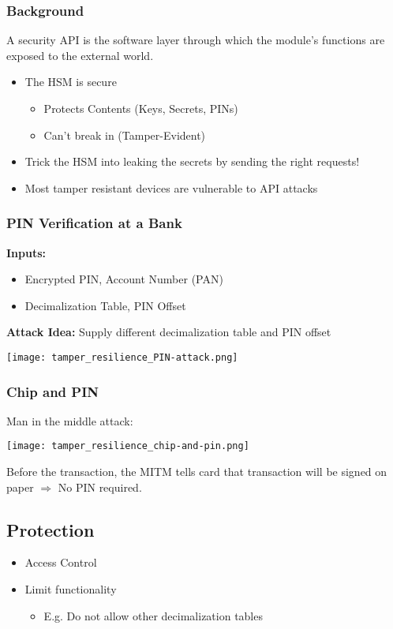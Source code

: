 \subsubsection{Background}
A security API is the software layer through which the module's functions are
exposed to the external world.
\begin{itemize}
  \item The HSM is secure
    \begin{itemize}
      \item Protects Contents (Keys, Secrets, PINs)
      \item Can’t break in (Tamper-Evident)
    \end{itemize}
  \item Trick the HSM into leaking the secrets by
    sending the right requests!
  \item Most tamper resistant devices are vulnerable to API attacks
\end{itemize}

\subsubsection{PIN Verification at a Bank}
\textbf{Inputs:}

\begin{itemize}
  \item Encrypted PIN, Account Number (PAN)
  \item Decimalization Table, PIN Offset
\end{itemize}
\textbf{Attack Idea:} Supply different decimalization table and PIN offset
\begin{center}
  \texttt{[image: tamper\_resilience\_PIN-attack.png]}
\end{center}

\subsubsection{Chip and PIN}
Man in the middle attack:
\begin{center}
  \texttt{[image: tamper\_resilience\_chip-and-pin.png]}
\end{center}
Before the transaction, the MITM tells card that transaction will be signed on
paper $\Rightarrow$ No PIN required.

\subsection{Protection}
\begin{itemize}
  \item Access Control
  \item Limit functionality
    \begin{itemize}
      \item E.g. Do not allow other decimalization tables
    \end{itemize}

\end{itemize}
